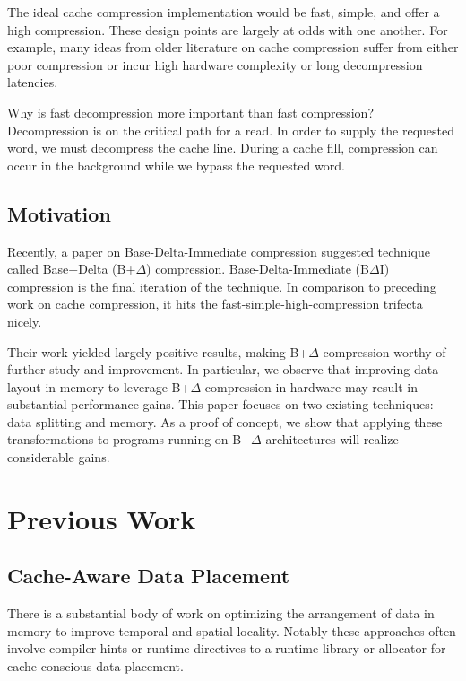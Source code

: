 \documentclass[pageno]{jpaper}
\begin{document}
The ideal cache compression implementation would be fast, simple, and offer a high compression. These design points are largely at odds with one another. For example, many ideas from older literature on cache compression suffer from either poor compression or incur high hardware complexity or long decompression latencies.

Why is fast decompression more important than fast compression? Decompression is on the critical path for a read. In order to supply the requested word, we must decompress the cache line. During a cache fill, compression can occur in the background while we bypass the requested word.

\subsection{Motivation}

Recently, a paper on Base-Delta-Immediate compression \cite{baseDeltaImm} suggested technique called Base+Delta (B+$\Delta$) compression. Base-Delta-Immediate (B$\Delta$I) compression is the final iteration of the technique. In comparison to preceding work on cache compression, it hits the fast-simple-high-compression trifecta nicely.

Their work yielded largely positive results, making B+$\Delta$ compression worthy of further study and improvement. In particular, we observe that improving data layout in memory to leverage B+$\Delta$ compression in hardware may result in substantial performance gains. This paper focuses on two existing techniques: data splitting and memory. As a proof of concept, we show that applying these transformations to programs running on B+$\Delta$ architectures will realize considerable gains.


\section{Previous Work}

\subsection{Cache-Aware Data Placement}

There is a substantial body of work on optimizing the arrangement of data in memory to improve temporal and spatial locality. Notably these approaches often involve compiler hints or runtime directives to a runtime library \cite{structLayoutHints} or allocator \cite{structLayoutAllocHints} for cache conscious data placement.
\end{document}
